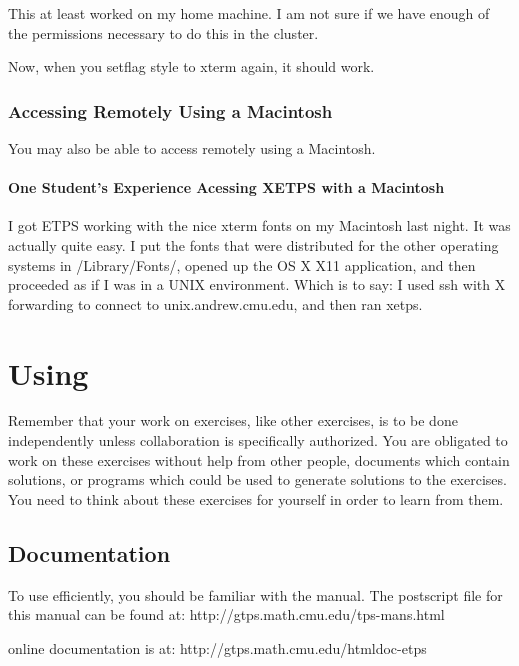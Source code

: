 \documentclass{article}
\begin{document}
This at least worked on my home machine.  I am not sure if we have
enough of the permissions necessary to do this in the cluster.

Now, when you setflag style to xterm again, it should work.

\subsubsection{Accessing {\ETPS} Remotely Using a Macintosh}

You may also be able to access {\ETPS} remotely using a Macintosh.

\paragraph{One Student's Experience Acessing XETPS with a Macintosh}

I got ETPS working with the nice xterm fonts on my Macintosh last
night. It was actually quite easy. I put the fonts that were
distributed for the other operating systems in /Library/Fonts/, opened
up the OS X X11 application, and then proceeded as if I was in a UNIX
environment. Which is to say: I used ssh with X forwarding to connect
to unix.andrew.cmu.edu, and then ran xetps.


\pagebreak

\section{Using {\ETPS}}

Remember that your work on {\ETPS} exercises, like other exercises,
is to be done independently unless collaboration is specifically
authorized. You are obligated to work on these exercises
without help from other people, documents which contain
solutions, or programs which could be used to generate
solutions to the exercises. You need to think about these exercises
for yourself in order to learn from them.

\subsection{Documentation}

To use {\ETPS} efficiently, you should be familiar with the
{\ETPS} manual. The postscript file for this manual can be found at:\newline{}
http://gtps.math.cmu.edu/tps-mans.html

{\ETPS} online documentation is at:\newline{}
http://gtps.math.cmu.edu/htmldoc-etps
\end{document}
